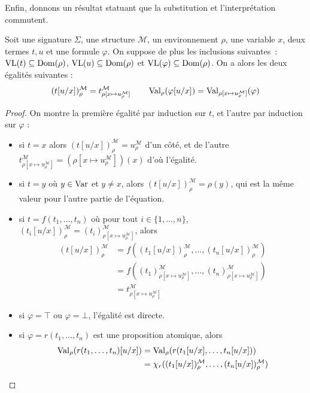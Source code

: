 Enfin, donnons un résultat statuant que la substitution et l'interprétation
commutent.

\begin{proposition}\label{prop.comm.subst.env}
  Soit une signature $\Sigma$, une structure $\mathcal M$, un environnement
  $\rho$, une variable $x$, deux termes $t,u$ et une formule $\varphi$. On
  suppose de plus les inclusions suivantes~: $\operatorname{VL}(t)\subseteq \operatorname{Dom}(\rho)$,
  $\operatorname{VL}(u)\subseteq\operatorname{Dom}(\rho)$ et $\operatorname{VL}(\varphi)\subseteq\operatorname{Dom}(\rho)$. On a alors
  les deux égalités suivantes :
  \[(t[u/x])_\rho^\mathcal M = t^\mathcal M_{\rho[x \mapsto u^\mathcal M_\rho]} \qquad
  \operatorname{Val}_\rho(\varphi[u/x]) = \operatorname{Val}_{\rho[x\mapsto u^\mathcal M_\rho]}(\varphi)\]
\end{proposition}

\begin{proof}
  On montre la première égalité par induction sur $t$, et l'autre par induction
  sur $\varphi$ :
  \begin{itemize}
  \item si $t = x$ alors $(t[u/x])_\rho^\mathcal M = u^\mathcal M_\rho$ d'un côté,
    et de l'autre
    $t^\mathcal M_{\rho[x\mapsto u_\rho^\mathcal M]} =
    (\rho[x\mapsto u_\rho^\mathcal M])(x)$
    d'où l'égalité.
  \item si $t = y$ où $y\in\operatorname{Var}$ et $y\neq x$, alors
    $(t[u/x])_\rho^\mathcal M = \rho(y)$, qui est la même valeur pour l'autre
    partie de l'équation.
  \item si $t = f(t_1,\ldots,t_n)$ où pour tout $i\in\{1,\ldots,n\}$,
    $(t_i[u/x])^\mathcal M_\rho = (t_i)^\mathcal M_{\rho[x\mapsto u^\mathcal M_\rho]}$, alors
    \begin{align*}
      (t[u/x])^\mathcal M_\rho &= f((t_1[u/x])^\mathcal M_\rho,\ldots,
      (t_n[u/x])^\mathcal M_\rho)\\
      &= f((t_1)^\mathcal M_{\rho[x\mapsto u^\mathcal M_\rho]},\ldots,
      (t_n)^\mathcal M_{\rho[x\mapsto u^\mathcal M_\rho]})\\
      &= t^\mathcal M_{\rho[x\mapsto u^\mathcal M_\rho]}
    \end{align*}
  \item si $\varphi = \top$ ou $\varphi = \bot$, l'égalité est directe.
  \item si $\varphi = r(t_1,\ldots,t_n)$ est une proposition atomique, alors
    \begin{align*}
      \Val_\rho(r(t_1,\ldots,t_n)[u/x])
      &= \Val_\rho(r(t_1[u/x],\ldots,t_n[u/x]))\\
      &= \chi_r((t_1[u/x])^\mathcal M_\rho,\ldots,(t_n[u/x])^\mathcal M_\rho)\\

\end{align*}
\end{itemize}
\end{proof}

